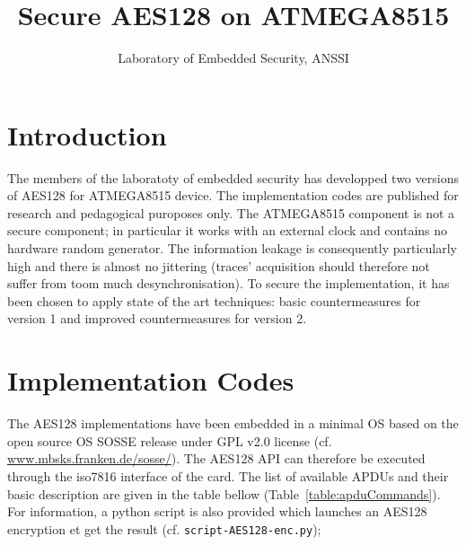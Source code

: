 \documentclass{article}
\title{Secure AES128 on ATMEGA8515}
\author{Laboratory of Embedded Security, ANSSI}
\begin{document}
\pagestyle{plain}
\maketitle
\section{Introduction}

The members of the laboratoty of embedded security has developped two versions of AES128 for ATMEGA8515 device. The implementation codes are published for research and pedagogical puroposes only. The ATMEGA8515 component is not a secure component; in particular it works with an external clock and contains no hardware random generator. The information leakage is consequently particularly high and there is almost no jittering (traces' acquisition should therefore not suffer from toom much desynchronisation). To secure the implementation, it has been chosen to apply state of the art techniques: basic countermeasures for version 1 and improved countermeasures for version 2.


\section{Implementation Codes}

The AES128 implementations have been embedded in a minimal OS based on the open source OS SOSSE release under GPL v2.0 license (cf. \url{www.mbsks.franken.de/sosse/}). The AES128 API can therefore be executed through the iso7816 interface of the card. The list of available APDUs and their basic description are given in the table bellow (Table~\ref{table:apduCommands}). For information, a python script is also provided which launches an AES128 encryption et get the result (cf. \texttt{script-AES128-enc.py});
\end{document}
